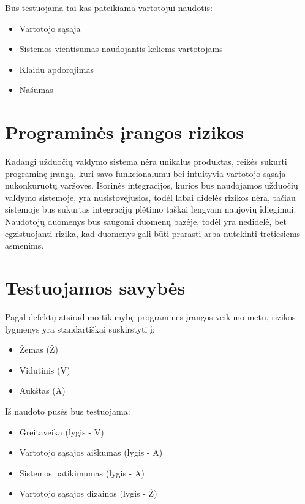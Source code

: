 \documentclass{VUMIFPSkursinis}
\begin{document}
    Bus testuojama tai kas pateikiama vartotojui naudotis:
    
    \begin{itemize}
    	\item Vartotojo sąsaja
    	\item Sistemos vientisumas naudojantis keliems vartotojams
    	\item Klaidu apdorojimas
    	\item Našumas
    \end{itemize}


    \section{Programinės įrangos rizikos}

    Kadangi užduočių valdymo sistema nėra unikalus produktas, reikės sukurti programinę įrangą,
    kuri savo funkcionalumu bei intuityvia vartotojo sąsaja nukonkuruotų varžoves.
    Išorinės integracijos, kurios bus naudojamos užduočių valdymo sistemoje, yra nusistovėjusios, todėl labai didelės
    rizikos nėra, tačiau sistemoje bus sukurtas integracijų plėtimo taškai lengvam naujovių įdiegimui.
    Naudotojų duomenys bus saugomi duomenų bazėje, todėl yra nedidelė, bet egzistuojanti rizika, kad duomenys gali būti
    prarasti arba nutekinti tretiesiems asmenims.


    \section{Testuojamos savybės}

    Pagal defektų atsiradimo tikimybę programinės įrangos veikimo metu, rizikos lygmenys yra standartiškai suskirstyti į:

    \begin{itemize}
    	\item Žemas (Ž)
    	\item Vidutinis (V)
    	\item Aukštas (A)
    \end{itemize}

    Iš naudoto pusės bus testuojama:

    \begin{itemize}
    	\item Greitaveika (lygis - V)
    	\item Vartotojo sąsajos aiškumas (lygis - A)
    	\item Sistemos patikimumas (lygis - A)
    	\item Vartotojo sąsajos dizainos (lygis - Ž)
    \end{itemize}
\end{document}
